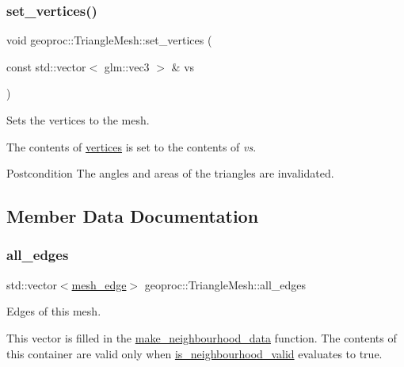 \subsubsection{\texorpdfstring{set\+\_\+vertices()}{set\_vertices()}\hspace{0.1cm}{\footnotesize\ttfamily [3/3]}}
{\footnotesize\ttfamily void geoproc\+::\+Triangle\+Mesh\+::set\+\_\+vertices (\begin{DoxyParamCaption}\item[{const std\+::vector$<$ glm\+::vec3 $>$ \&}]{vs }\end{DoxyParamCaption})}



Sets the vertices to the mesh. 

The contents of \hyperlink{classgeoproc_1_1TriangleMesh_a82c3351de37daa9440f53597f080992d}{vertices} is set to the contents of {\itshape vs}.

\begin{DoxyPostcond}{Postcondition}
The angles and areas of the triangles are invalidated. 
\end{DoxyPostcond}


\subsection{Member Data Documentation}
\mbox{\label{classgeoproc_1_1TriangleMesh_ab10f052ad932cd78056a55b58ddd475c}} 
\subsubsection{\texorpdfstring{all\+\_\+edges}{all\_edges}}
{\footnotesize\ttfamily std\+::vector$<$\hyperlink{classgeoproc_1_1mesh__edge}{mesh\+\_\+edge}$>$ geoproc\+::\+Triangle\+Mesh\+::all\+\_\+edges\hspace{0.3cm}{\ttfamily [protected]}}



Edges of this mesh. 

This vector is filled in the \hyperlink{classgeoproc_1_1TriangleMesh_a84003dfdfd5e591c00f01a797578ff1f}{make\+\_\+neighbourhood\+\_\+data} function. The contents of this container are valid only when \hyperlink{classgeoproc_1_1TriangleMesh_aa6f95b95709a72a14a15638bfeeed3f9}{is\+\_\+neighbourhood\+\_\+valid} evaluates to true.

